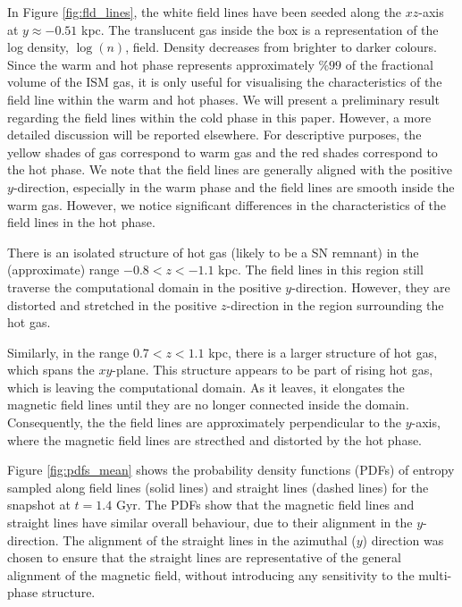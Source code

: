 \documentclass[useAMS,usenatbib]{mn2e}
\begin{document}
In Figure \vref{fig:fld_lines}, the white field lines have been seeded along 
the $xz$-axis at $y\approx-0.51$ kpc. 
The translucent gas inside the box is a representation of the log density, 
$\log(n)$, field. 
Density decreases from brighter to darker colours. 
Since the warm and hot phase represents approximately $\%99$ of the fractional
volume of the ISM gas, it is only useful for visualising the characteristics 
of the field line within the warm and hot phases. 
We will present a preliminary result regarding the field lines within the 
cold phase in this paper. 
However, a more detailed discussion will be reported elsewhere. 
For descriptive purposes, the yellow shades of gas correspond to warm gas and 
the red shades correspond to the hot phase. 
We note that the field lines are generally aligned with the positive 
$y$-direction, especially in the warm phase and the field lines are smooth 
inside the warm gas. 
However, we notice significant differences in the characteristics of the 
field lines in the hot phase.
 
There is an isolated structure of hot gas (likely to be a SN remnant) in the
(approximate) range $-0.8<z<-1.1$ kpc. 
The field lines in this region still traverse the computational domain in the 
positive $y$-direction. 
However, they are distorted and stretched in the positive $z$-direction in 
the region surrounding the hot gas.
  
Similarly, in the range $0.7<z<1.1$ kpc, there is a larger structure of hot 
gas, which spans the $xy$-plane. 
This structure appears to be part of rising hot gas, which is leaving the 
computational domain. As it leaves, it elongates the magnetic field lines 
until they are no longer connected inside the domain. 
Consequently, the the field lines are approximately perpendicular to the 
$y$-axis, where the magnetic field lines are strecthed and distorted by the 
hot phase.

\noindent 
Figure \ref{fig:pdfs_mean} shows the probability density functions (PDFs) of 
entropy sampled along field lines (solid lines) and straight lines (dashed
lines) for the snapshot at $t=1.4$ Gyr. 
The PDFs show that the magnetic field lines and straight lines have similar 
overall behaviour, due to their alignment in the $y$-direction. 
The alignment of the straight lines in the azimuthal ($y$) direction was 
chosen to ensure that the straight lines are representative of the general 
alignment of the magnetic field, without introducing any sensitivity to the 
multi-phase structure.
\end{document}
